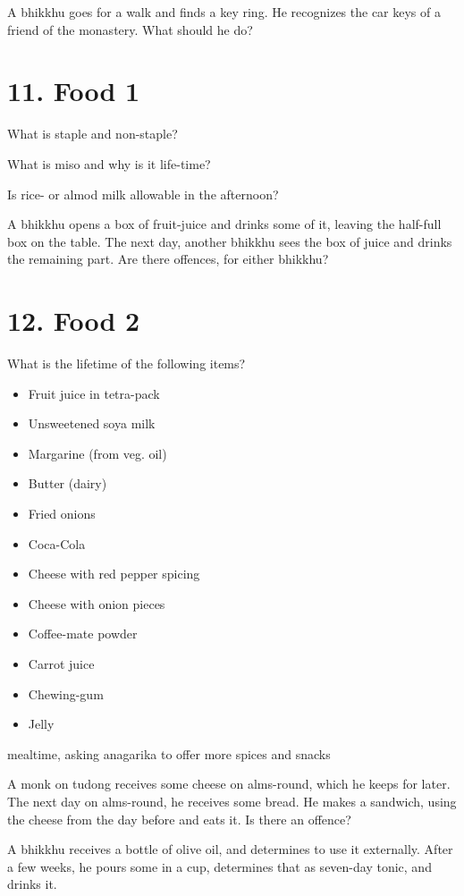 A bhikkhu goes for a walk and finds a key ring. He recognizes the car
keys of a friend of the monastery. What should he do?

\section{11. Food 1}

What is staple and non-staple?

What is miso and why is it life-time?

Is rice- or almod milk allowable in the afternoon?

A bhikkhu opens a box of fruit-juice and drinks some of it, leaving the
half-full box on the table. The next day, another bhikkhu sees the box
of juice and drinks the remaining part. Are there offences, for either
bhikkhu?

\section{12. Food 2}

What is the lifetime of the following items?

\begin{itemize}
\tightlist
\item
  Fruit juice in tetra-pack
\item
  Unsweetened soya milk
\item
  Margarine (from veg. oil)
\item
  Butter (dairy)
\item
  Fried onions
\item
  Coca-Cola
\item
  Cheese with red pepper spicing
\item
  Cheese with onion pieces
\item
  Coffee-mate powder
\item
  Carrot juice
\item
  Chewing-gum
\item
  Jelly
\end{itemize}

mealtime, asking anagarika to offer more spices and snacks

A monk on tudong receives some cheese on alms-round, which he keeps for
later. The next day on alms-round, he receives some bread. He makes a
sandwich, using the cheese from the day before and eats it. Is there an
offence?

A bhikkhu receives a bottle of olive oil, and determines to use it
externally. After a few weeks, he pours some in a cup, determines that
as seven-day tonic, and drinks it.

